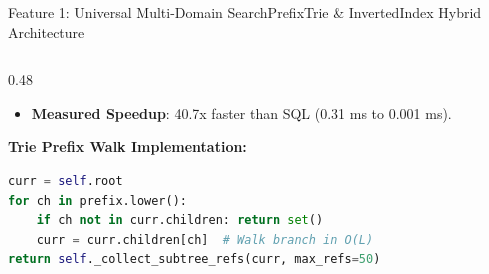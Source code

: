 \documentclass[aspectratio=169,10pt]{beamer}
\begin{document}
\begin{frame}[fragile,t]{Feature 1: Universal Multi-Domain Search}{PrefixTrie \& InvertedIndex Hybrid Architecture}
\begin{columns}[t]
\begin{column}{0.48\textwidth}
\begin{itemize}
        \item {\fontsize{8.0}{9.8}\selectfont \textbf{Measured Speedup}: 40.7x faster than SQL (0.31 ms to 0.001 ms).}
      \end{itemize}
      \vspace{0.1cm}
      {\fontsize{8.0}{10.0}\selectfont\textbf{\textcolor{KoinexaRed}{Trie Prefix Walk Implementation:}}}
\begin{lstlisting}[language=Python]
curr = self.root
for ch in prefix.lower():
    if ch not in curr.children: return set()
    curr = curr.children[ch]  # Walk branch in O(L)
return self._collect_subtree_refs(curr, max_refs=50)
\end{lstlisting}
    \end{column}
  \end{columns}
\end{frame}
\end{document}
